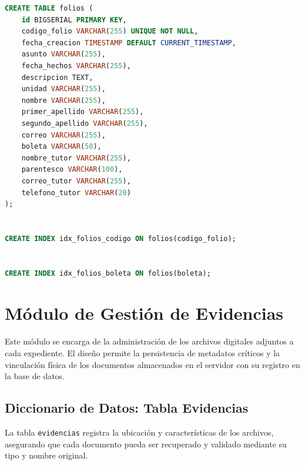 \begin{lstlisting}[language=SQL, caption={Script DDL para la tabla maestra de folios.}, label={lst:sql_folios}]
CREATE TABLE folios (
    id BIGSERIAL PRIMARY KEY,
    codigo_folio VARCHAR(255) UNIQUE NOT NULL,
    fecha_creacion TIMESTAMP DEFAULT CURRENT_TIMESTAMP,
    asunto VARCHAR(255),
    fecha_hechos VARCHAR(255),
    descripcion TEXT,
    unidad VARCHAR(255),
    nombre VARCHAR(255),
    primer_apellido VARCHAR(255),
    segundo_apellido VARCHAR(255),
    correo VARCHAR(255),
    boleta VARCHAR(50),
    nombre_tutor VARCHAR(255),
    parentesco VARCHAR(100),
    correo_tutor VARCHAR(255),
    telefono_tutor VARCHAR(20)
);


CREATE INDEX idx_folios_codigo ON folios(codigo_folio);


CREATE INDEX idx_folios_boleta ON folios(boleta);
\end{lstlisting}


\section{M\'odulo de Gesti\'on de Evidencias}
Este m\'odulo se encarga de la administraci\'on de los archivos digitales adjuntos a cada expediente. El diseño permite la persistencia de metadatos cr\'iticos y la vinculaci\'on f\'isica de los documentos almacenados en el servidor con su registro en la base de datos.

\subsection{Diccionario de Datos: Tabla Evidencias}
La tabla \texttt{evidencias} registra la ubicaci\'on y caracter\'isticas de los archivos, asegurando que cada documento pueda ser recuperado y validado mediante su tipo y nombre original.

